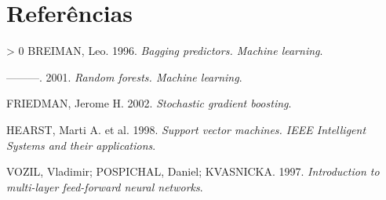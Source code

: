 \documentclass[
  12pt,
  portuguese,
]{report}
\newlength{\cslhangindent}
\newenvironment{CSLReferences}[3] %
 {%
  \setlength{\parindent}{0pt}
  \ifodd #1 \everypar{\setlength{\hangindent}{\cslhangindent}}\ignorespaces\fi
  \ifnum #2 > 0
  \setlength{\parskip}{#2\baselineskip}
  \fi
 }%
 {}
\begin{document}
\hypertarget{referuxeancias}{%
\chapter*{Referências}\label{referuxeancias}}

\hypertarget{refs}{}
\begin{CSLReferences}{1}{0}
\leavevmode\hypertarget{ref-breiman1996}{}%
BREIMAN, Leo. 1996. \emph{Bagging predictors. Machine learning}.

\leavevmode\hypertarget{ref-breiman2001}{}%
---------. 2001. \emph{Random forests. Machine learning}.

\leavevmode\hypertarget{ref-friedman2002}{}%
FRIEDMAN, Jerome H. 2002. \emph{Stochastic gradient boosting}.

\leavevmode\hypertarget{ref-hearst1998}{}%
HEARST, Marti A. et al. 1998. \emph{Support vector machines. IEEE Intelligent Systems and their applications}.

\leavevmode\hypertarget{ref-svozil1997}{}%
VOZIL, Vladimir; POSPICHAL, Daniel; KVASNICKA. 1997. \emph{Introduction to multi-layer feed-forward neural networks}.

\end{CSLReferences}
\end{document}
